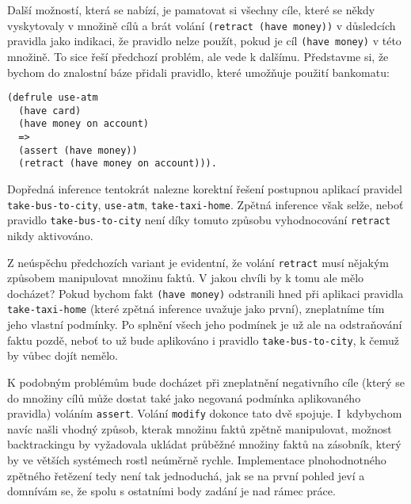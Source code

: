 Další možností, která se nabízí, je pamatovat si všechny cíle, které se někdy
vyskytovaly v množině cílů a brát volání \verb|(retract (have money))| v
důsledcích pravidla jako indikaci, že pravidlo nelze použít, pokud je cíl
\verb|(have money)| v této množině. To sice řeší předchozí problém, ale vede k
dalšímu. Představme si, že bychom do znalostní báze přidali pravidlo, které
umožňuje použití bankomatu:
\begin{verbatim}
(defrule use-atm
  (have card)
  (have money on account)
  =>
  (assert (have money))
  (retract (have money on account))).
\end{verbatim}
Dopředná inference tentokrát nalezne korektní řešení postupnou aplikací pravidel
\verb|take-bus-to-city|, \verb|use-atm|, \verb|take-taxi-home|. Zpětná inference
však selže, neboť pravidlo \verb|take-bus-to-city| není díky tomuto způsobu
vyhodnocování \verb|retract| nikdy aktivováno.

Z neúspěchu předchozích variant je evidentní, že volání \verb|retract| musí
nějakým způsobem manipulovat množinu faktů. V jakou chvíli by k tomu ale mělo
docházet? Pokud bychom fakt \verb|(have money)| odstranili hned při aplikaci
pravidla \verb|take-taxi-home| (které zpětná inference uvažuje jako první),
zneplatníme tím jeho vlastní podmínky. Po splnění všech jeho podmínek je už ale
na odstraňování faktu pozdě, neboť to už bude aplikováno i pravidlo
\verb|take-bus-to-city|, k čemuž by vůbec dojít nemělo.

K podobným problémům bude docházet při zneplatnění negativního cíle (který se do
množiny cílů může dostat také jako negovaná podmínka aplikovaného pravidla) voláním
\verb|assert|. Volání \verb|modify| dokonce tato dvě spojuje. I~kdybychom navíc
našli vhodný způsob, kterak množinu faktů zpětně manipulovat, možnost
backtrackingu by vyžadovala ukládat průběžné množiny faktů na zásobník, který by
ve větších systémech rostl neúměrně rychle. Implementace plnohodnotného zpětného
řetězení tedy není tak jednoduchá, jak se na první pohled jeví a domnívám se, že
spolu s ostatními body zadání je nad rámec práce.

